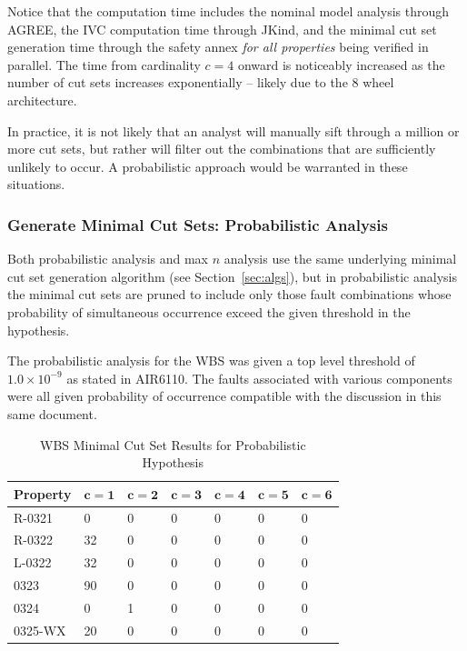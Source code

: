 Notice that the computation time includes the nominal model analysis through AGREE, the IVC computation time through JKind, and the minimal cut set generation time through the safety annex {\em for all properties} being verified in parallel. The time from cardinality $c = 4$ onward is noticeably increased as the number of cut sets increases exponentially -- likely due to the 8 wheel architecture. 

In practice, it is not likely that an analyst will manually sift through a million or more cut sets, but rather will filter out the combinations that are sufficiently unlikely to occur. A probabilistic approach would be warranted in these situations. 

\subsubsection{Generate Minimal Cut Sets: Probabilistic Analysis}
\label{sec:prob_generate}
Both probabilistic analysis and max $n$ analysis use the same underlying minimal cut set generation algorithm (see Section~\ref{sec:algs}), but in probabilistic analysis the minimal cut sets are pruned to include only those fault combinations whose probability of simultaneous occurrence exceed the given threshold in the hypothesis. 

The probabilistic analysis for the WBS was given a top level threshold of $1.0 \times 10^{-9}$ as stated in AIR6110. The faults associated with various components were all given probability of occurrence compatible with the discussion in this same document. 

\begin{center}
\begin{table}[htbp]
    \begin{tabular}{ | l | l | l | l | l | l | l | }
    \hline
    \textbf{Property} & $\bm{c = 1}$ & $\bm{c = 2}$ & $\bm{c = 3}$ & $\bm{c = 4}$ 
		& $\bm{c = 5}$ & $\bm{c = 6}$   \\ \hline \hline
    R-0321 & 0 & 0 & 0 & 0 & 0 & 0  \\ \hline
    R-0322 & 32 & 0 & 0 &0 &0 &0  \\ \hline
    L-0322 & 32 & 0 & 0 & 0 & 0 & 0   \\ \hline
    0323 & 90 & 0 & 0 & 0 & 0 & 0   \\ \hline
    0324 & 0 & 1 & 0 & 0 & 0 & 0  \\ \hline
    0325-WX & 20 & 0 & 0 &0 &0 & 0   \\ \hline
    \end{tabular}
    \caption{WBS Minimal Cut Set Results for Probabilistic Hypothesis}
    \label{tab:wbs_prob_results}
\end{table}
\end{center}


